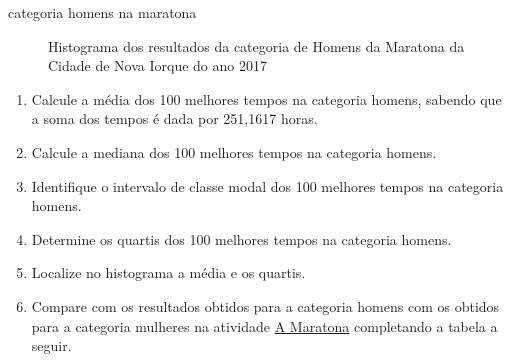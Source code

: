 \begin{task}{ categoria homens na maratona}
\begin{figure}[H]
\caption{Histograma dos resultados da categoria de Homens da Maratona da Cidade de Nova Iorque do ano 2017}\label{\detokenize{PE104-2:fig-histograma-maratona-homens}}\label{\detokenize{PE104-2:id3}}\end{figure}
\begin{enumerate}
\item {} 
Calcule a média dos 100 melhores tempos na categoria homens, sabendo que a soma dos tempos é dada por 251,1617 horas.

\item {} 
Calcule a mediana dos 100 melhores tempos na categoria homens.

\item {} 
Identifique o intervalo de classe modal dos 100 melhores tempos na categoria homens.

\item {} 
Determine os quartis dos 100 melhores tempos na categoria homens.

\item {} 
Localize no histograma a média e os quartis.

\item {} 
Compare com os resultados obtidos para a categoria homens com os obtidos para a categoria mulheres na atividade \hyperref[\detokenize{PE104-0:ativ-maratona-de-ny}]{A Maratona} completando a tabela a seguir.


\end{enumerate}
\end{task}
